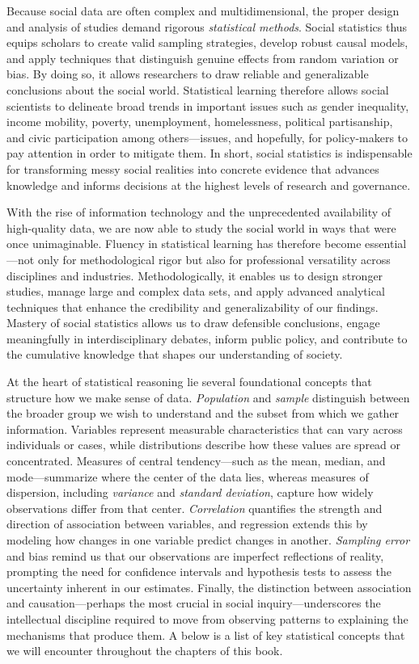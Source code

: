 \documentclass[
  letterpaper,
  DIV=11,
  numbers=noendperiod]{scrreprt}
\begin{document}
Because social data are often complex and multidimensional, the proper
design and analysis of studies demand rigorous \emph{statistical
methods}. Social statistics thus equips scholars to create valid
sampling strategies, develop robust causal models, and apply techniques
that distinguish genuine effects from random variation or bias. By doing
so, it allows researchers to draw reliable and generalizable conclusions
about the social world. Statistical learning therefore allows social
scientists to delineate broad trends in important issues such as gender
inequality, income mobility, poverty, unemployment, homelessness,
political partisanship, and civic participation among others---issues,
and hopefully, for policy-makers to pay attention in order to mitigate
them. In short, social statistics is indispensable for transforming
messy social realities into concrete evidence that advances knowledge
and informs decisions at the highest levels of research and governance.

With the rise of information technology and the unprecedented
availability of high-quality data, we are now able to study the social
world in ways that were once unimaginable. Fluency in statistical
learning has therefore become essential---not only for methodological
rigor but also for professional versatility across disciplines and
industries. Methodologically, it enables us to design stronger studies,
manage large and complex data sets, and apply advanced analytical
techniques that enhance the credibility and generalizability of our
findings. Mastery of social statistics allows us to draw defensible
conclusions, engage meaningfully in interdisciplinary debates, inform
public policy, and contribute to the cumulative knowledge that shapes
our understanding of society.

At the heart of statistical reasoning lie several foundational concepts
that structure how we make sense of data. \emph{Population} and
\emph{sample} distinguish between the broader group we wish to
understand and the subset from which we gather information. Variables
represent measurable characteristics that can vary across individuals or
cases, while distributions describe how these values are spread or
concentrated. Measures of central tendency---such as the mean, median,
and mode---summarize where the center of the data lies, whereas measures
of dispersion, including \emph{variance} and \emph{standard deviation},
capture how widely observations differ from that center.
\emph{Correlation} quantifies the strength and direction of association
between variables, and regression extends this by modeling how changes
in one variable predict changes in another. \emph{Sampling error} and
bias remind us that our observations are imperfect reflections of
reality, prompting the need for confidence intervals and hypothesis
tests to assess the uncertainty inherent in our estimates. Finally, the
distinction between association and causation---perhaps the most crucial
in social inquiry---underscores the intellectual discipline required to
move from observing patterns to explaining the mechanisms that produce
them. A below is a list of key statistical concepts that we will
encounter throughout the chapters of this book.
\end{document}
